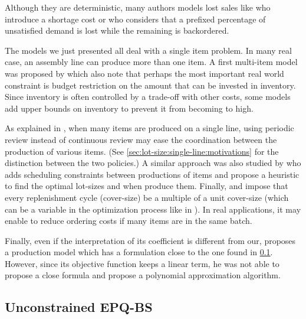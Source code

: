Although they are deterministic, many authors models lost sales like \citet{Salameh2003} who introduce a shortage cost or \citet{Park1982} who considers that a prefixed percentage of unsatisfied demand is lost while the remaining is backordered.


\medskip


The models we just presented all deal with a single item problem.
In many real case, an assembly line can produce more than one item.
A first multi-item model was proposed by \citet{Hadley1963} which also note that perhaps the most important real world constraint is budget restriction on the amount that can be invested in inventory.
Since inventory is often controlled by a trade-off with other costs, some models add upper bounds on inventory to prevent it from becoming to high.


As explained in \citet{Eynan2007}, when many items are produced on a single line, using periodic review instead of continuous review may ease the coordination between the production of various items.
(See \cref{sec:lot-size:single-line:motivations} for the distinction between the two policies.)
A similar approach was also studied by \citet{Madigan1968} who adds scheduling constraints between productions of items and propose a heuristic to find the optimal lot-sizes and when produce them.
Finally, \citet{Bomberger1966} and \citet{Goyal1974} impose that every replenishment cycle (cover-size) be a multiple of a unit cover-size (which can be a variable in the optimization process like in \citet{Silver1976}).
In real applications, it may enable to reduce ordering costs if many items are in the same batch.


\medskip


Finally, even if the interpretation of its coefficient is different from our, \citet{Ziegler1982} proposes a production model which has a formulation close to the one found in \cref{sec:lot-size:single-line:models:unconstrained}.
However, since its objective function keeps a linear term, he was not able to propose a close formula and propose a polynomial approximation algorithm.



\subsection{Unconstrained EPQ-BS}
\label{sec:lot-size:single-line:models:unconstrained}


